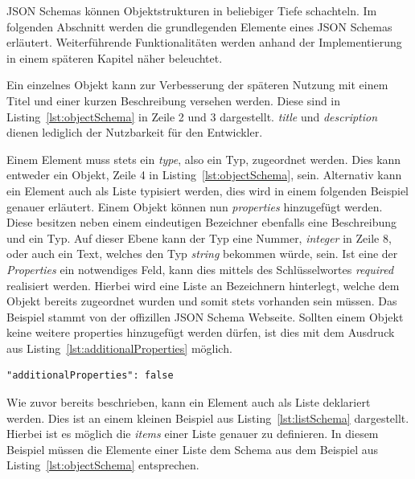 JSON Schemas können Objektstrukturen in beliebiger Tiefe schachteln.
Im folgenden Abschnitt werden die grundlegenden Elemente eines JSON Schemas erläutert.
Weiterführende Funktionalitäten werden anhand der Implementierung in einem späteren Kapitel näher beleuchtet.

Ein einzelnes Objekt kann zur Verbesserung der späteren Nutzung mit einem Titel und einer kurzen Beschreibung versehen werden.
Diese sind in Listing~\ref{lst:objectSchema} in Zeile 2 und 3 dargestellt.
\textit{title} und \textit{description} dienen lediglich der Nutzbarkeit für den Entwickler.



Einem Element muss stets ein \textit{type}, also ein Typ, zugeordnet werden.
Dies kann entweder ein Objekt, Zeile 4 in Listing~\ref{lst:objectSchema}, sein.
Alternativ kann ein Element auch als Liste typisiert werden, dies wird in einem folgenden Beispiel genauer erläutert.
Einem Objekt können nun \textit{properties} hinzugefügt werden.
Diese besitzen neben einem eindeutigen Bezeichner ebenfalls eine Beschreibung und ein Typ.
Auf dieser Ebene kann der Typ eine Nummer, \textit{integer} in Zeile 8, oder auch ein Text, welches den Typ \textit{string} bekommen würde, sein.
Ist eine der \textit{Properties} ein notwendiges Feld, kann dies mittels des Schlüsselwortes \textit{required} realisiert werden.
Hierbei wird eine Liste an Bezeichnern hinterlegt, welche dem Objekt bereits zugeordnet wurden und somit stets vorhanden sein müssen.
Das Beispiel stammt von der offizillen JSON Schema Webseite.\cite*{schemaExample}
Sollten einem Objekt keine weitere properties hinzugefügt werden dürfen, ist dies mit dem Ausdruck aus Listing~\ref{lst:additionalProperties} möglich.

\begin{lstlisting}[caption={Begrenzung der Properties eines Schemas},label={lst:additionalProperties}]
"additionalProperties": false
\end{lstlisting}

Wie zuvor bereits beschrieben, kann ein Element auch als Liste deklariert werden.
Dies ist an einem kleinen Beispiel aus Listing~\ref{lst:listSchema} dargestellt.
Hierbei ist es möglich die \textit{items} einer Liste genauer zu definieren.
In diesem Beispiel müssen die Elemente einer Liste dem Schema aus dem Beispiel aus Listing~\ref{lst:objectSchema} entsprechen.

